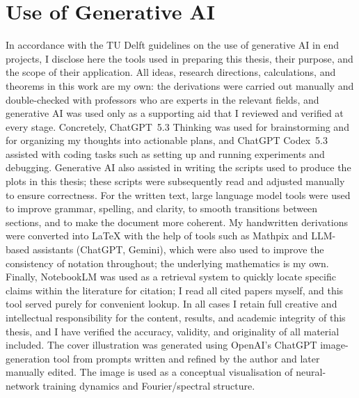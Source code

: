 \chapter{Use of Generative AI}\label{cha:genai}

In accordance with the TU Delft guidelines on the use of generative AI in end
projects, I disclose here the tools used in preparing this thesis, their
purpose, and the scope of their application. All ideas, research directions,
calculations, and theorems in this work are my own: the derivations were
carried out manually and double-checked with professors who are experts in the
relevant fields, and generative AI was used only as a supporting aid that I
reviewed and verified at every stage. Concretely, ChatGPT~5.3 Thinking was used
for brainstorming and for organizing my thoughts into actionable plans, and
ChatGPT Codex~5.3 assisted with coding tasks such as setting up and running
experiments and debugging. Generative AI also assisted in writing the scripts
used to produce the plots in this thesis; these scripts were subsequently read
and adjusted manually to ensure correctness. For the written text, large
language model tools were used to improve grammar, spelling, and clarity, to
smooth transitions between sections, and to make the document more coherent. My
handwritten derivations were converted into \LaTeX{} with the help of tools
such as Mathpix and LLM-based assistants (ChatGPT, Gemini), which were also
used to improve the consistency of notation throughout; the underlying
mathematics is my own. Finally, NotebookLM was used as a retrieval system to
quickly locate specific claims within the literature for citation; I read all
cited papers myself, and this tool served purely for convenient lookup. In all
cases I retain full creative and intellectual responsibility for the content,
results, and academic integrity of this thesis, and I have verified the
accuracy, validity, and originality of all material included. The cover
illustration was generated using OpenAI's ChatGPT image-generation tool from
prompts written and refined by the author and later manually edited. The image
is used as a conceptual visualisation of neural-network training dynamics and
Fourier/spectral structure.
